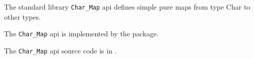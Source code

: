

The standard library {\tt Char\_Map} api defines simple pure maps from 
type Char to other types.

The {\tt Char\_Map} api is implemented by the  package.

The {\tt Char\_Map} api source code is in .





